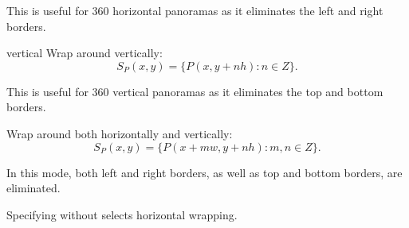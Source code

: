 \begin{codelist}
\begin{codelist}
    This is useful for 360\angulardegree{} horizontal panoramas as it eliminates the left and
    right borders.

  \item[vertical]\itemend
    Wrap around vertically:
    \[
    S_P(x, y) = \{P(x, y + n h): n \in Z\}.
    \]

    This is useful for 360\angulardegree{} vertical panoramas as it eliminates the top and
    bottom borders.

  \item[\itempar{both \\ horizontal+vertical
      \\ vertical+horizontal}]\itemend
    Wrap around both horizontally and vertically:
    \[
    S_P(x, y) = \{P(x + m w, y + n h): m, n \in Z\}.
    \]

    In this mode, both left and right borders, as well as top and bottom borders, are
    eliminated.
  \end{codelist}

  Specifying  without  selects horizontal
  wrapping.
\end{codelist}



